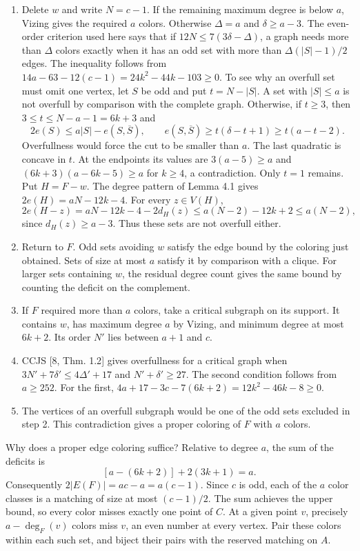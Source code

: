 \documentclass[english,11pt,a4paper]{article}
\providecommand{\tightlist}{\setlength{\itemsep}{0pt}\setlength{\parskip}{0pt}}
\begin{document}
\begin{enumerate}
\def\labelenumi{\arabic{enumi}.}
\tightlist
\item
  Delete \(w\) and write \(N=c-1\). If the remaining maximum degree is below \(a\), Vizing gives the required \(a\) colors. Otherwise \(\Delta=a\) and \(\delta\ge a-3\). The even-order criterion used here says that if \(12N\le7(3\delta-\Delta)\), a graph needs more than \(\Delta\) colors exactly when it has an odd set with more than \(\Delta(|S|-1)/2\) edges. The inequality follows from \(14a-63-12(c-1)=24k^2-44k-103\ge0\). To see why an overfull set must omit one vertex, let \(S\) be odd and put \(t=N-|S|\). A set with \(|S|\le a\) is not overfull by comparison with the complete graph. Otherwise, if \(t\ge3\), then \(3\le t\le N-a-1=6k+3\) and \[2e(S)\le a|S|-e(S,\overline S),\qquad e(S,\overline S)\ge t(\delta-t+1)\ge t(a-t-2).\] Overfullness would force the cut to be smaller than \(a\). The last quadratic is concave in \(t\). At the endpoints its values are \(3(a-5)\ge a\) and \((6k+3)(a-6k-5)\ge a\) for \(k\ge4\), a contradiction. Only \(t=1\) remains. Put \(H=F-w\). The degree pattern of Lemma 4.1 gives \(2e(H)=aN-12k-4\). For every \(z\in V(H)\), \[2e(H-z)=aN-12k-4-2d_H(z)\le a(N-2)-12k+2\le a(N-2),\] since \(d_H(z)\ge a-3\). Thus these sets are not overfull either.
\item
  Return to \(F\). Odd sets avoiding \(w\) satisfy the edge bound by the coloring just obtained. Sets of size at most \(a\) satisfy it by comparison with a clique. For larger sets containing \(w\), the residual degree count gives the same bound by counting the deficit on the complement.
\item
  If \(F\) required more than \(a\) colors, take a critical subgraph on its support. It contains \(w\), has maximum degree \(a\) by Vizing, and minimum degree at most \(6k+2\). Its order \(N'\) lies between \(a+1\) and \(c\).
\item
  CCJS {[}8, Thm. 1.2{]} gives overfullness for a critical graph when \(3N'+7\delta'\le4\Delta'+17\) and \(N'+\delta'\ge27\). The second condition follows from \(a\ge252\). For the first, \(4a+17-3c-7(6k+2)=12k^2-46k-8\ge0\).
\item
  The vertices of an overfull subgraph would be one of the odd sets excluded in step 2. This contradiction gives a proper coloring of \(F\) with \(a\) colors.
\end{enumerate}

Why does a proper edge coloring suffice? Relative to degree \(a\), the sum of the deficits is \[[a-(6k+2)]+2(3k+1)=a.\] Consequently \(2|E(F)|=ac-a=a(c-1)\). Since \(c\) is odd, each of the \(a\) color classes is a matching of size at most \((c-1)/2\). The sum achieves the upper bound, so every color misses exactly one point of \(C\). At a given point \(v\), precisely \(a-\deg_F(v)\) colors miss \(v\), an even number at every vertex. Pair these colors within each such set, and biject their pairs with the reserved matching on \(A\).
\end{document}
